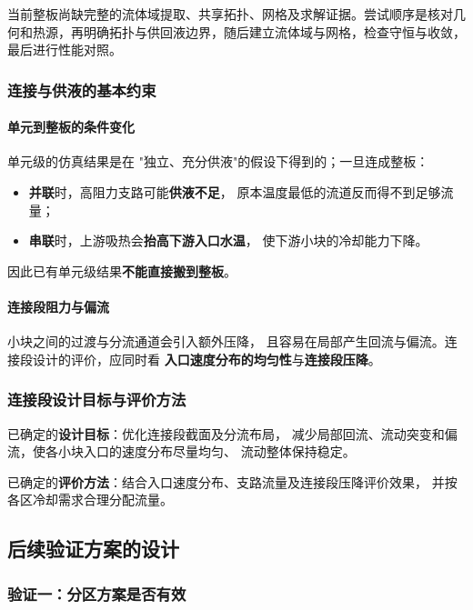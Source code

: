 \documentclass[stage2,fontset=fandol]{ydzjreport}
\begin{document}
当前整板尚缺完整的流体域提取、共享拓扑、网格及求解证据。尝试顺序是核对几何和热源，再明确拓扑与供回液边界，随后建立流体域与网格，检查守恒与收敛，最后进行性能对照。

\subsubsection{连接与供液的基本约束}

\paragraph{单元到整板的条件变化}
单元级的仿真结果是在
"独立、充分供液"的假设下得到的；一旦连成整板：

\begin{itemize}
  \item \textbf{并联}时，高阻力支路可能\textbf{供液不足}，
        原本温度最低的流道反而得不到足够流量；
  \item \textbf{串联}时，上游吸热会\textbf{抬高下游入口水温}，
        使下游小块的冷却能力下降。
\end{itemize}

因此已有单元级结果\textbf{不能直接搬到整板}。

\paragraph{连接段阻力与偏流}
小块之间的过渡与分流通道会引入额外压降，
且容易在局部产生回流与偏流。连接段设计的评价，应同时看
\textbf{入口速度分布的均匀性}与\textbf{连接段压降}。


\subsubsection{连接段设计目标与评价方法}

已确定的\textbf{设计目标}：优化连接段截面及分流布局，
减少局部回流、流动突变和偏流，使各小块入口的速度分布尽量均匀、
流动整体保持稳定。

已确定的\textbf{评价方法}：结合入口速度分布、支路流量及连接段压降评价效果，
并按各区冷却需求合理分配流量。

\subsection{后续验证方案的设计}

\subsubsection{验证一：分区方案是否有效}
\end{document}
